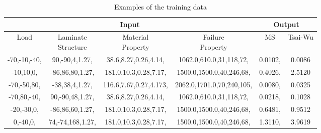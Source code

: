 \begin{table}[!t]	
\centering
\caption{Examples of the training data}
\label{tab:traing-data}
\begin{adjustbox}{width=0.5\textwidth}
	\begin{tabular}{cccc|cc}
		\toprule
		\multicolumn{4}{c}{\textbf{Input}} &  \multicolumn{2}{c}{\textbf{Output}} \\
		\midrule
		Load  &  \makecell{Laminate \\ Structure }  & \makecell{Material \\ Property} & \makecell{Failure \\  Property}  & MS & Tsai-Wu \\
		\midrule

		-70,-10,-40,  & 90,-90,4,1.27, & 38.6,8.27,0.26,4.14,  & 1062.0,610.0,31,118,72,  & 0.0102, & 0.0086 \\
		-10,10,0,     & -86,86,80,1.27,& 181.0,10.3,0.28,7.17, & 1500.0,1500.0,40,246,68, & 0.4026, & 2.5120 \\
		-70,-50,80,   & -38,38,4,1.27, & 116.6,7.67,0.27,4.173,& 2062.0,1701.0,70,240,105,& 0.0080, & 0.0325 \\
		-70,80,-40,   & 90,-90,48,1.27,& 38.6,8.27,0.26,4.14,  & 1062.0,610.0,31,118,72,  & 0.0218, & 0.1028 \\
		-20,-30,0,    & -86,86,60,1.27,& 181.0,10.3,0.28,7.17, & 1500.0,1500.0,40,246,68, & 0.6481, & 0.9512 \\
		0,-40,0,      & 74,-74,168,1.27,& 181.0,10.3,0.28,7.17,& 1500.0,1500.0,40,246,68, & 1.3110, & 3.9619 \\
		\bottomrule
		\end{tabular}
\end{adjustbox}
\end{table}

